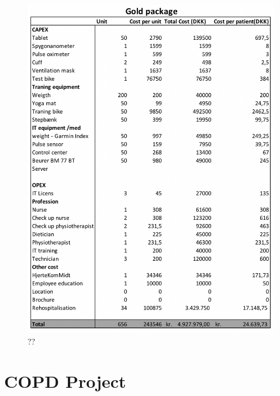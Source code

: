 \begin{figure}[H]
\centering
\includegraphics[width=1\textwidth]{Figure/Gold.png}
\caption{??}
\label{fig: Gold}
\end{figure} 


\chapter{COPD Project}

